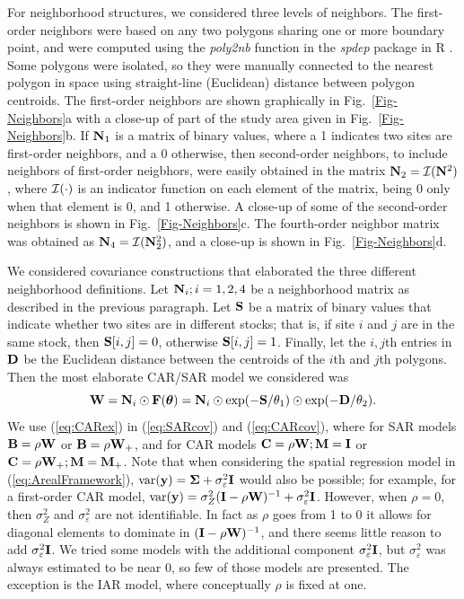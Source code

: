 \documentclass[11pt, titlepage]{article}\usepackage[]{graphicx}\usepackage[]{color}
\begin{document}
For neighborhood structures, we considered three levels of neighbors.  The first-order neighbors were based on any two polygons sharing one or more boundary point, and were computed using the \emph{poly2nb} function in the \emph{spdep} package \citep{Biva:Pira:comp:2015} in R \citep{R:Deve:Core:ALan:2014}. Some polygons were isolated, so they were manually connected to the nearest polygon in space using straight-line (Euclidean) distance between polygon centroids.  The first-order neighbors are shown graphically in Fig.~\ref{Fig-Neighbors}a with a close-up of part of the study area given in Fig.~\ref{Fig-Neighbors}b.  If $\mathbf{N}_1$ is a matrix of binary values, where a 1 indicates two sites are first-order neighbors, and a 0 otherwise, then second-order neighbors, to include neighbors of first-order neigbhors, were easily obtained in the matrix $\mathbf{N}_2 = \mathcal{I}(\mathbf{N}^2)$, where $\mathcal{I}(\cdot)$ is an indicator function on each element of the matrix, being 0 only when that element is 0, and 1 otherwise. A close-up of some of the second-order neighbors is shown in Fig.~\ref{Fig-Neighbors}c. The fourth-order neighbor matrix was obtained as $\mathbf{N}_4 = \mathcal{I}(\mathbf{N}_2^2)$, and a close-up is shown in Fig.~\ref{Fig-Neighbors}d.

We considered covariance constructions that elaborated the three different neighborhood definitions.  Let $\mathbf{N}_i; i = 1,2,4$ be a neighborhood matrix as described in the previous paragraph.  Let $\mathbf{S}$ be a matrix of binary values that indicate whether two sites are in different stocks; that is, if site $i$ and $j$ are in the same stock, then $\mathbf{S}[i,j] = 0$, otherwise $\mathbf{S}[i,j] = 1$.  Finally, let the $i,j$th entries in $\mathbf{D}$ be the Euclidean distance between the centroids of the $i$th and $j$th polygons.  Then the most elaborate CAR/SAR model we considered was
\begin{equation} \label{eq:CARex}
	\mathbf{W} = \mathbf{N}_i \odot \mathbf{F}(\mbox{\boldmath $\theta$}) = \mathbf{N}_i \odot \exp(-\mathbf{S}/\theta_1) \odot \exp(-\mathbf{D}/\theta_2).
\end{equation}
We use (\ref{eq:CARex}) in (\ref{eq:SARcov}) and (\ref{eq:CARcov}), where for SAR models $\mathbf{B} = \rho\mathbf{W}$ or $\mathbf{B} = \rho\mathbf{W}_+$, and for CAR models $\mathbf{C} = \rho\mathbf{W}; \mathbf{M} = \mathbf{I}$ or $\mathbf{C} = \rho\mathbf{W}_+; \mathbf{M} = \mathbf{M}_+$. Note that when considering the spatial regression model in (\ref{eq:ArealFramework}), $\textrm{var}(\mathbf{y}) = \mbox{\boldmath $\Sigma$} + \sigma^2_\varepsilon\mathbf{I}$ would also be possible; for example, for a first-order CAR model, $\textrm{var}(\mathbf{y}) = \sigma_Z^2(\mathbf{I} - \rho\mathbf{W})^{-1} + \sigma^2_\varepsilon\mathbf{I}$.  However, when $\rho=0$, then $\sigma_Z^2$ and $\sigma^2_\varepsilon$ are not identifiable. In fact as $\rho$ goes from 1 to 0 it allows for diagonal elements to dominate in $(\mathbf{I} - \rho\mathbf{W})^{-1}$, and there seems little reason to add $\sigma^2_\varepsilon\mathbf{I}$.  We tried some models with the additional component $\sigma^2_\varepsilon\mathbf{I}$, but $\sigma^2_\varepsilon$ was always estimated to be near 0, so few of those models are presented.  The exception is the IAR model, where conceptually $\rho$ is fixed at one.
\end{document}
